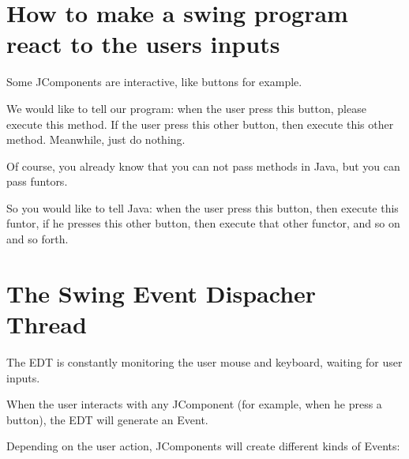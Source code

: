 \documentclass[a4paper, 9pt]{extarticle}
\begin{document}
\newpage







\section{How to make a swing program react to the users inputs}

Some JComponents are interactive, like buttons for example.

We would like to tell our program: when the user press this button, please
execute this method. If the user press this other button, then execute this
other method. Meanwhile, just do nothing.

Of course, you already know that you can not pass methods in Java, but you can pass funtors.

So you would like to tell Java: when the user press this button, then execute
this funtor, if he presses this other button, then execute that other functor,
and so on and so forth.


\section{The Swing Event Dispacher Thread}

The EDT is constantly monitoring the user mouse and keyboard, waiting for user inputs.

When the user interacts with any JComponent (for example, when he press a button), the EDT will generate an Event.

Depending on the user action, JComponents will create different kinds of Events:
\end{document}
